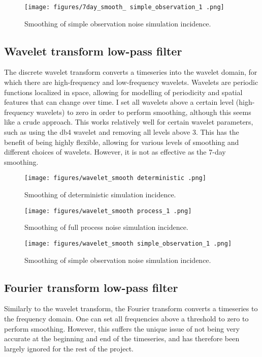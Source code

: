 \documentclass{article}
\begin{document}
\clearpage
\begin{figure}[h!]
    \centering
    \texttt{[image: figures/7day\_smooth\_ simple\_observation\_1 .png]}
    \caption{Smoothing of simple observation noise simulation incidence.}
\end{figure}

\subsection{Wavelet transform low-pass filter}
The discrete wavelet transform converts a timeseries into the wavelet domain, for which there are high-frequency and low-frequency wavelets. Wavelets are periodic functions localized in space, allowing for modelling of periodicity and spatial features that can change over time. I set all wavelets above a certain level (high-frequency wavelets) to zero in order to perform smoothing, although this seems like a crude approach. This works relatively well for certain wavelet parameters, such as using the db4 wavelet and removing all levels above 3. This has the benefit of being highly flexible, allowing for various levels of smoothing and different choices of wavelets. However, it is not as effective as the 7-day smoothing.

\clearpage
\begin{figure}[h!]
    \centering
    \texttt{[image: figures/wavelet\_smooth deterministic .png]}
    \caption{Smoothing of deterministic simulation incidence.}
\end{figure}


\clearpage
\begin{figure}[h!]
    \centering
    \texttt{[image: figures/wavelet\_smooth process\_1 .png]}
    \caption{Smoothing of full process noise simulation incidence.}
\end{figure}

\clearpage
\begin{figure}[h!]
    \centering
    \texttt{[image: figures/wavelet\_smooth simple\_observation\_1 .png]}
    \caption{Smoothing of simple observation noise simulation incidence.}
\end{figure}



\subsection{Fourier transform low-pass filter}
Similarly to the wavelet transform, the Fourier transform converts a timeseries to the frequency domain. One can set all frequencies above a threshold to zero to perform smoothing. However, this suffers the unique issue of not being very accurate at the beginning and end of the timeseries, and has therefore been largely ignored for the rest of the project.
\end{document}
